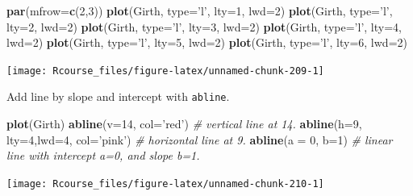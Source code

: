 \documentclass[]{book}
\newenvironment{Shaded}{\begin{snugshade}}{\end{snugshade}}
\newcommand{\KeywordTok}[1]{\textcolor[rgb]{0.13,0.29,0.53}{\textbf{#1}}}
\newcommand{\DataTypeTok}[1]{\textcolor[rgb]{0.13,0.29,0.53}{#1}}
\newcommand{\DecValTok}[1]{\textcolor[rgb]{0.00,0.00,0.81}{#1}}
\newcommand{\StringTok}[1]{\textcolor[rgb]{0.31,0.60,0.02}{#1}}
\newcommand{\CommentTok}[1]{\textcolor[rgb]{0.56,0.35,0.01}{\textit{#1}}}
\newcommand{\NormalTok}[1]{#1}
\theoremstyle{definition}
\theoremstyle{definition}
\theoremstyle{definition}
\theoremstyle{remark}
\begin{document}
\begin{Shaded}
\begin{Highlighting}[]
\KeywordTok{par}\NormalTok{(}\DataTypeTok{mfrow=}\KeywordTok{c}\NormalTok{(}\DecValTok{2}\NormalTok{,}\DecValTok{3}\NormalTok{))}
\KeywordTok{plot}\NormalTok{(Girth, }\DataTypeTok{type=}\StringTok{'l'}\NormalTok{, }\DataTypeTok{lty=}\DecValTok{1}\NormalTok{, }\DataTypeTok{lwd=}\DecValTok{2}\NormalTok{)}
\KeywordTok{plot}\NormalTok{(Girth, }\DataTypeTok{type=}\StringTok{'l'}\NormalTok{, }\DataTypeTok{lty=}\DecValTok{2}\NormalTok{, }\DataTypeTok{lwd=}\DecValTok{2}\NormalTok{)}
\KeywordTok{plot}\NormalTok{(Girth, }\DataTypeTok{type=}\StringTok{'l'}\NormalTok{, }\DataTypeTok{lty=}\DecValTok{3}\NormalTok{, }\DataTypeTok{lwd=}\DecValTok{2}\NormalTok{)}
\KeywordTok{plot}\NormalTok{(Girth, }\DataTypeTok{type=}\StringTok{'l'}\NormalTok{, }\DataTypeTok{lty=}\DecValTok{4}\NormalTok{, }\DataTypeTok{lwd=}\DecValTok{2}\NormalTok{)}
\KeywordTok{plot}\NormalTok{(Girth, }\DataTypeTok{type=}\StringTok{'l'}\NormalTok{, }\DataTypeTok{lty=}\DecValTok{5}\NormalTok{, }\DataTypeTok{lwd=}\DecValTok{2}\NormalTok{)}
\KeywordTok{plot}\NormalTok{(Girth, }\DataTypeTok{type=}\StringTok{'l'}\NormalTok{, }\DataTypeTok{lty=}\DecValTok{6}\NormalTok{, }\DataTypeTok{lwd=}\DecValTok{2}\NormalTok{)}
\end{Highlighting}
\end{Shaded}

\texttt{[image: Rcourse\_files/figure-latex/unnamed-chunk-209-1]}

Add line by slope and intercept with \texttt{abline}.

\begin{Shaded}
\begin{Highlighting}[]
\KeywordTok{plot}\NormalTok{(Girth)}
\KeywordTok{abline}\NormalTok{(}\DataTypeTok{v=}\DecValTok{14}\NormalTok{, }\DataTypeTok{col=}\StringTok{'red'}\NormalTok{) }\CommentTok{# vertical line at 14.}
\KeywordTok{abline}\NormalTok{(}\DataTypeTok{h=}\DecValTok{9}\NormalTok{, }\DataTypeTok{lty=}\DecValTok{4}\NormalTok{,}\DataTypeTok{lwd=}\DecValTok{4}\NormalTok{, }\DataTypeTok{col=}\StringTok{'pink'}\NormalTok{) }\CommentTok{# horizontal line at 9.}
\KeywordTok{abline}\NormalTok{(}\DataTypeTok{a =} \DecValTok{0}\NormalTok{, }\DataTypeTok{b=}\DecValTok{1}\NormalTok{) }\CommentTok{# linear line with intercept a=0, and slope b=1.}
\end{Highlighting}
\end{Shaded}

\texttt{[image: Rcourse\_files/figure-latex/unnamed-chunk-210-1]}
\end{document}
